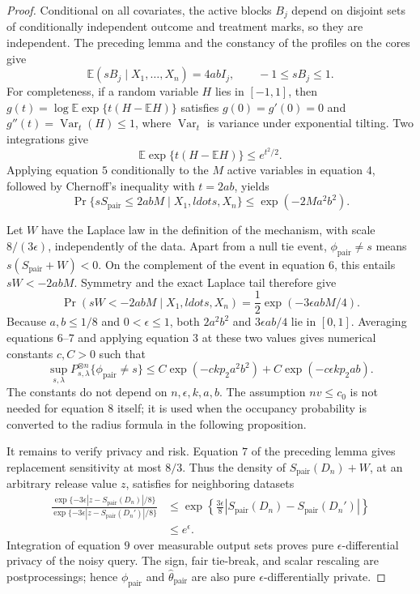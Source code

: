 \documentclass{article}
\begin{document}
\begin{proof}
Conditional on all covariates, the active blocks \(B_j\) depend on disjoint sets of conditionally independent outcome and treatment marks, so they are independent.  The preceding lemma and the constancy of the profiles on the cores give
\[
 \mathbb E(sB_j\mid X_1,\ldots,X_n)=4abI_j,
 \qquad -1\le sB_j\le1. \tag{4}
\]
For completeness, if a random variable \(H\) lies in \([-1,1]\), then
\(g(t)=\log\mathbb E\exp\{t(H-\mathbb EH)\}\) satisfies \(g(0)=g'(0)=0\) and \(g''(t)=\operatorname{Var}_t(H)\le1\), where \(\operatorname{Var}_t\) is variance under exponential tilting.  Two integrations give
\[
 \mathbb E\exp\{t(H-\mathbb EH)\}\le e^{t^2/2}. \tag{5}
\]
Applying equation \(5\) conditionally to the \(M\) active variables in equation \(4\), followed by Chernoff's inequality with \(t=2ab\), yields
\[
 \Pr\{sS_{\mathrm{pair}}\le2abM\mid X_1,ldots,X_n\}
 \le\exp(-2Ma^2b^2). \tag{6}
\]

Let \(W\) have the Laplace law in the definition of the mechanism, with scale \(8/(3\epsilon)\), independently of the data.  Apart from a null tie event, \(\phi_{\mathrm{pair}}\ne s\) means \(s(S_{\mathrm{pair}}+W)<0\).  On the complement of the event in equation \(6\), this entails \(sW<-2abM\).  Symmetry and the exact Laplace tail therefore give
\[
 \Pr(sW<-2abM\mid X_1,ldots,X_n)
 =\frac12\exp(-3\epsilon abM/4). \tag{7}
\]
Because \(a,b\le1/8\) and \(0<\epsilon\le1\), both \(2a^2b^2\) and \(3\epsilon ab/4\) lie in \([0,1]\).  Averaging equations \(6\)--\(7\) and applying equation \(3\) at these two values gives numerical constants \(c,C>0\) such that
\[
 \sup_{s,\lambda}P_{s,\lambda}^{\otimes n}
 \{\phi_{\mathrm{pair}}\ne s\}
 \le C\exp(-ckp_2a^2b^2)
      +C\exp(-c\epsilon kp_2ab). \tag{8}
\]
The constants do not depend on \(n,\epsilon,k,a,b\).  The assumption \(nv\le c_0\) is not needed for equation \(8\) itself; it is used when the occupancy probability is converted to the radius formula in the following proposition.

It remains to verify privacy and risk.  Equation \(7\) of the preceding lemma gives replacement sensitivity at most \(8/3\).  Thus the density of \(S_{\mathrm{pair}}(D_n)+W\), at an arbitrary release value \(z\), satisfies for neighboring datasets
\[
 \begin{aligned}
 \frac{\exp\{-3\epsilon|z-S_{\mathrm{pair}}(D_n)|/8\}}
      {\exp\{-3\epsilon|z-S_{\mathrm{pair}}(D_n')|/8\}}
 &\le
 \exp\left\{\frac{3\epsilon}{8}
 |S_{\mathrm{pair}}(D_n)-S_{\mathrm{pair}}(D_n')|\right\}\\
 &\le e^\epsilon. \tag{9}
 \end{aligned}
\]
Integration of equation \(9\) over measurable output sets proves pure \(\epsilon\)-differential privacy of the noisy query.  The sign, fair tie-break, and scalar rescaling are postprocessings; hence \(\phi_{\mathrm{pair}}\) and \(\widehat\theta_{\mathrm{pair}}\) are also pure \(\epsilon\)-differentially private.


\end{proof}
\end{document}
